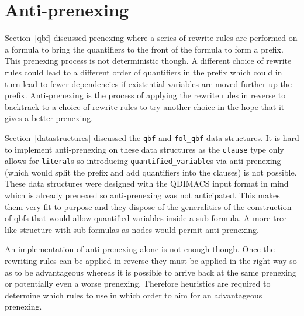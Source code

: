 \section{Anti-prenexing}
Section~\ref{qbf} discussed prenexing where a series of rewrite rules are performed on a formula to bring the quantifiers to the front of the formula to form a prefix. This prenexing process is not deterministic though. A different choice of rewrite rules could lead to a different order of quantifiers in the prefix which could in turn lead to fewer dependencies if existential variables are moved further up the prefix. Anti-prenexing is the process of applying the rewrite rules in reverse to backtrack to a choice of rewrite rules to try another choice in the hope that it gives a better prenexing.

Section~\ref{datastructures} discussed the \texttt{qbf} and \texttt{fol\_qbf} data structures. It is hard to implement anti-prenexing on these data structures as the \texttt{clause} type only allows for \texttt{literal}s so introducing \texttt{quantified\_variable}s via anti-prenexing (which would split the prefix and add quantifiers into the clauses) is not possible. These data structures were designed with the QDIMACS input format in mind which is already prenexed so anti-prenexing was not anticipated. This makes them very fit-to-purpose and they dispose of the generalities of the construction of \glspl{qbf} that would allow quantified variables inside a sub-formula. A more tree like structure with sub-formulas as nodes would permit anti-prenexing.

An implementation of anti-prenexing alone is not enough though. Once the rewriting rules can be applied in reverse they must be applied in the right way so as to be advantageous whereas it is possible to arrive back at the same prenexing or potentially even a worse prenexing. Therefore heuristics are required to determine which rules to use in which order to aim for an advantageous prenexing.
